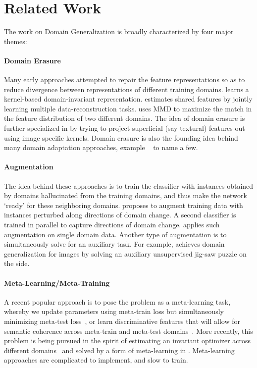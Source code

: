 \documentclass{article}
\begin{document}
\section{Related Work}
The work on Domain Generalization is broadly characterized by four major themes:

\paragraph{Domain Erasure}
Many early approaches attempted to repair the feature representations so as to reduce divergence between representations of different training domains.   \citet{MuandetBS13} learns a kernel-based domain-invariant representation. \citet{GhifaryBZB15} estimates shared features by jointly learning multiple data-reconstruction tasks.   \citet{Li2018DomainGW} uses MMD to maximize the match in the feature distribution of two different domains. The  idea of domain erasure is further specialized in \cite{WangZZ2019} by trying to project superficial (say textural) features out using image specific kernels. 
Domain erasure is also the founding idea behind many domain adaptation approaches, example ~\cite{Ben-David:2006:ARD:2976456.2976474,HoffmanMN18,Ganin16} to name a few.



\paragraph{Augmentation} The idea behind these approaches is to train the classifier with instances obtained by domains hallucinated from the training domains, and thus make the network `ready' for these neighboring domains. \cite{VihariSSS18} proposes to augment training data with instances perturbed along directions of domain change. A second classifier is trained in parallel to capture directions of domain change. 
\citet{VolpiNSDM2018} applies such augmentation on single domain data.  Another type of augmentation is to simultaneously solve for an auxiliary task.  For example, \citet{CarlucciAS2019} achieves domain generalization for images by solving an auxiliary unsupervised jig-saw puzzle on the side.  



\paragraph{Meta-Learning/Meta-Training}
A recent popular approach is to pose the problem as a meta-learning task, whereby we update parameters using meta-train loss but simultaneously minimizing meta-test loss~\cite{liYY2018},\cite{BalajiSR2018} or learn discriminative features that will allow for semantic coherence across meta-train and meta-test domains~\cite{DouCK19}.  More recently, this problem is being pursued in the spirit of estimating an invariant optimizer across different domains~ and solved by a form of meta-learning in \cite{ArjovskyLID19}. Meta-learning approaches are complicated to implement, and slow to train.  
\end{document}
